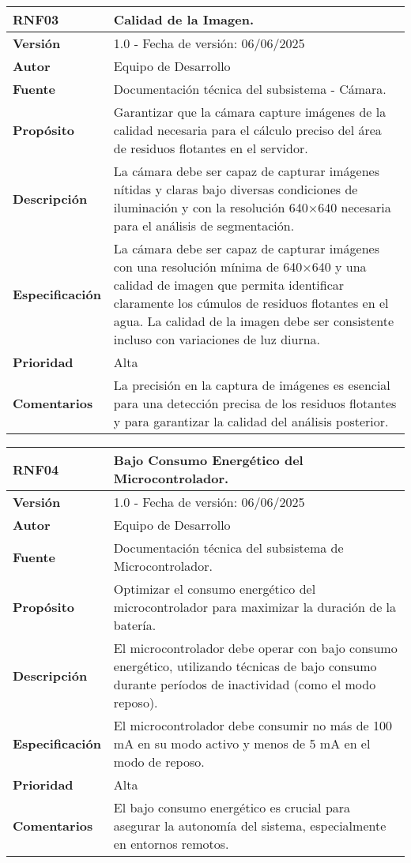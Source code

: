 \begin{longtable}{|l|p{12cm}|}
\hline
\textbf{RNF03} & \textbf{Calidad de la Imagen.} \\
\hline
\endfirsthead
\hline
\textbf{Versión} & 1.0 - Fecha de versión: 06/06/2025 \\
\hline
\textbf{Autor} & Equipo de Desarrollo \\
\hline
\textbf{Fuente} & Documentación técnica del subsistema - Cámara. \\
\hline
\textbf{Propósito} & Garantizar que la cámara capture imágenes de la calidad necesaria para el cálculo preciso del área de residuos flotantes en el servidor. \\
\hline
\textbf{Descripción} & La cámara debe ser capaz de capturar imágenes nítidas y claras bajo diversas condiciones de iluminación y con la resolución 640×640 necesaria para el análisis de segmentación. \\
\hline
\textbf{Especificación} & La cámara debe ser capaz de capturar imágenes con una resolución mínima de 640×640 y una calidad de imagen que permita identificar claramente los cúmulos de residuos flotantes en el agua. La calidad de la imagen debe ser consistente incluso con variaciones de luz diurna. \\
\hline
\textbf{Prioridad} & Alta \\
\hline
\textbf{Comentarios} & La precisión en la captura de imágenes es esencial para una detección precisa de los residuos flotantes y para garantizar la calidad del análisis posterior. \\
\hline
\end{longtable}

\begin{longtable}{|l|p{12cm}|}
\hline
\textbf{RNF04} & \textbf{Bajo Consumo Energético del Microcontrolador.} \\
\hline
\endfirsthead
\hline
\textbf{Versión} & 1.0 - Fecha de versión: 06/06/2025 \\
\hline
\textbf{Autor} & Equipo de Desarrollo \\
\hline
\textbf{Fuente} & Documentación técnica del subsistema de Microcontrolador. \\
\hline
\textbf{Propósito} & Optimizar el consumo energético del microcontrolador para maximizar la duración de la batería. \\
\hline
\textbf{Descripción} & El microcontrolador debe operar con bajo consumo energético, utilizando técnicas de bajo consumo durante períodos de inactividad (como el modo reposo). \\
\hline
\textbf{Especificación} & El microcontrolador debe consumir no más de 100 mA en su modo activo y menos de 5 mA en el modo de reposo. \\
\hline
\textbf{Prioridad} & Alta \\
\hline
\textbf{Comentarios} & El bajo consumo energético es crucial para asegurar la autonomía del sistema, especialmente en entornos remotos. \\
\hline
\end{longtable}

